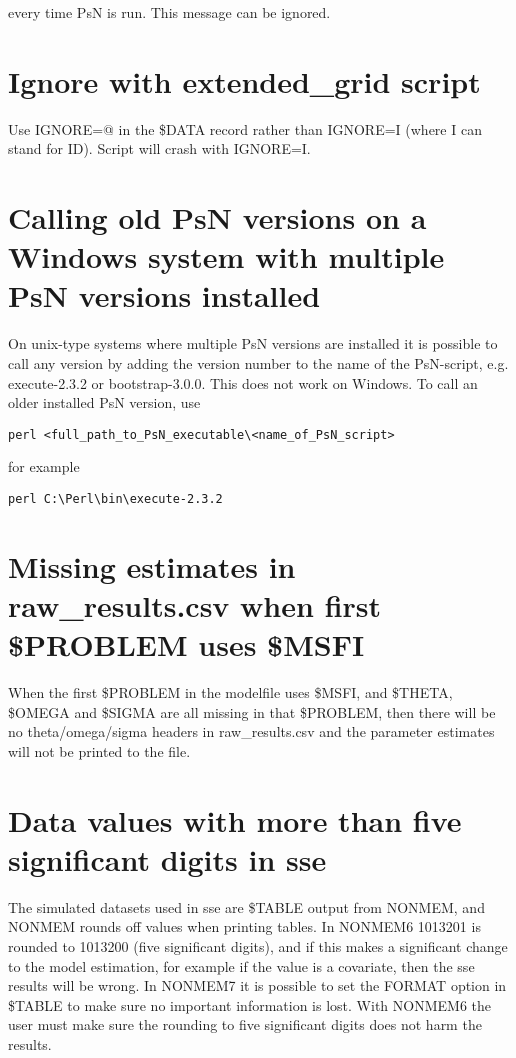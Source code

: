 \documentclass[a4paper,12pt]{article}
\begin{document}
every time PsN is run. This message can be ignored.

\section{Ignore with extended\_grid script}
Use IGNORE=@ in the \$DATA record rather than IGNORE=I (where I can stand for ID). Script will crash with IGNORE=I.

\section{Calling old PsN versions on a Windows system with multiple PsN versions installed}
On unix-type systems where multiple PsN versions are installed it is possible to call any version by adding the version number to the name of the PsN-script, e.g. execute-2.3.2 or bootstrap-3.0.0. This does not work on Windows. To call an older installed PsN version, use 

\begin{verbatim}
perl <full_path_to_PsN_executable\<name_of_PsN_script>
\end{verbatim}

for example

\begin{verbatim}
perl C:\Perl\bin\execute-2.3.2
\end{verbatim}

\section{Missing estimates in raw\_results.csv when first \$PROBLEM uses \$MSFI}
When the first \$PROBLEM in the modelfile uses \$MSFI, and \$THETA, \$OMEGA and \$SIGMA are all missing in that \$PROBLEM, then there will be no theta/omega/sigma headers in raw\_results.csv and the parameter estimates will not be printed to the file.

\section{Data values with more than five significant digits in sse}
The simulated datasets used in sse are \$TABLE output from NONMEM, and NONMEM rounds off values when printing tables. In NONMEM6 1013201 is rounded to 1013200 (five significant digits), and if this makes a significant change to the model estimation, for example if the value is a covariate, then the sse results will be wrong. In NONMEM7 it is possible to set the FORMAT option in \$TABLE to make sure no important information is lost. With NONMEM6 the user must make sure the rounding to five significant digits does not harm the results.
\end{document}
